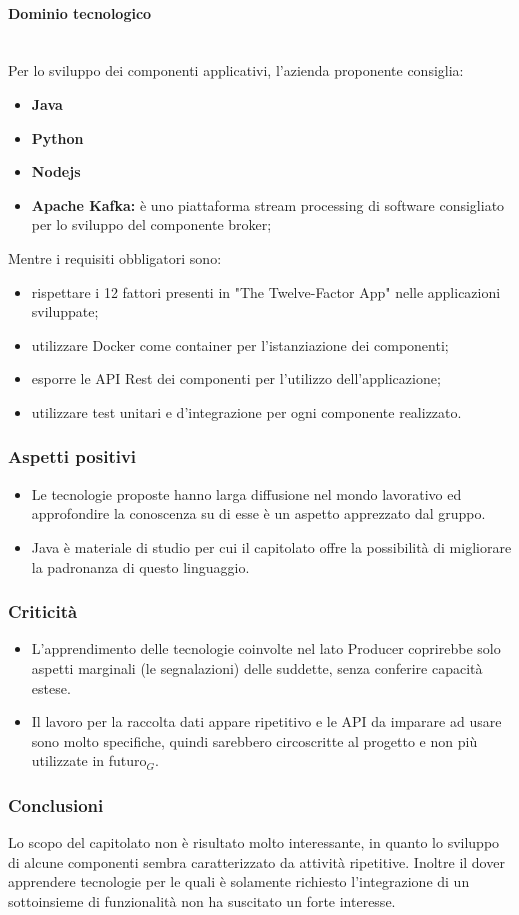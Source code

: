 \paragraph{Dominio tecnologico}\mbox{}\\
Per lo sviluppo dei componenti applicativi, l'azienda proponente consiglia:
\begin{itemize}
	\item \textbf{Java}
	\item \textbf{Python}
	\item \textbf{Nodejs}
	\item \textbf{Apache Kafka:} è uno piattaforma stream processing di software
	 consigliato per lo sviluppo del componente broker;
\end{itemize}
Mentre i requisiti obbligatori sono:
\begin{itemize}
	\item rispettare i 12 fattori presenti in "The Twelve-Factor App" nelle 
	applicazioni sviluppate;
	\item utilizzare Docker come container per l'istanziazione dei componenti;
	\item esporre le API Rest dei componenti per l'utilizzo dell'applicazione; 
	\item utilizzare test unitari e d'integrazione per ogni componente 
	realizzato.
\end{itemize}
\subsubsection{Aspetti positivi}
\begin{itemize}
	\item Le tecnologie proposte hanno larga diffusione nel mondo lavorativo ed
	 approfondire la conoscenza su di esse è un aspetto apprezzato dal gruppo.
	\item Java è materiale di studio per cui il capitolato offre la possibilità di 
	migliorare la padronanza di questo linguaggio.
\end{itemize}
\subsubsection{Criticità}
\begin{itemize}
	\item L'apprendimento delle tecnologie coinvolte nel lato 
	Producer coprirebbe solo aspetti marginali (le segnalazioni) delle
	suddette, senza conferire capacità estese. 
	\item Il lavoro per la raccolta dati appare ripetitivo e le
	 API da imparare ad usare sono molto specifiche, quindi sarebbero 
	 circoscritte al progetto e non più utilizzate in futuro$_{G}$. 
	
\end{itemize}
\subsubsection{Conclusioni}
Lo scopo del capitolato non è risultato molto interessante, in quanto lo sviluppo 
 di alcune componenti sembra caratterizzato da attività ripetitive. Inoltre il dover
 apprendere tecnologie per le quali è solamente richiesto l'integrazione di un 
 sottoinsieme di funzionalità non ha suscitato un forte interesse.